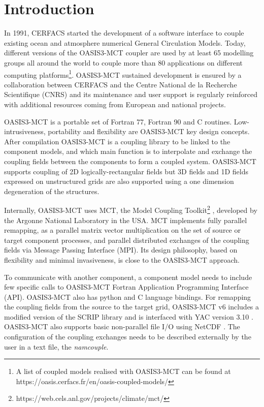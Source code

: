 \newpage
\chapter{Introduction}
\label{sec_step}

In 1991, CERFACS started the development of
a software interface to couple existing ocean and atmosphere numerical General
Circulation Models. Today, different versions of the 
OASIS3-MCT coupler are used by at least 65 modelling groups all around the
world to couple more than 80 applications on different computing platforms\footnote{A list of
coupled models realised with OASIS3-MCT can be found at https://oasis.cerfacs.fr/en/oasis-coupled-models/}.
OASIS3-MCT sustained development is ensured by a collaboration
between CERFACS and the Centre National de la Recherche Scientifique
(CNRS) and its maintenance and user support is regularly reinforced
with additional resources coming from European and national projects.

OASIS3-MCT is a portable set of Fortran 77, Fortran 90 and C
routines. Low-intrusiveness, portability and flexibility are
OASIS3-MCT key design concepts. After compilation OASIS3-MCT is a
coupling library to be linked to the component models, and which main
function is to interpolate and exchange the coupling fields between the components to form a coupled system.  OASIS3-MCT supports  coupling of 2D
logically-rectangular fields but 3D fields and 1D fields expressed on
unstructured grids are also supported using a one dimension
degeneration of the structures.

Internally, OASIS3-MCT uses MCT, the Model
Coupling Toolkit\footnote{https://web.cels.anl.gov/projects/climate/mct/} \citep{mct_larson} \citep{mct_jacob}, 
developed by the Argonne National Laboratory in the USA. MCT implements fully parallel remapping, as a parallel matrix vector 
multiplication on the set of source or
target component processes, and parallel distributed exchanges of the coupling
fields via Message Passing Interface
(MPI). 
Its design philosophy, based on flexibility and minimal invasiveness,
is close to the OASIS3-MCT approach. 

To communicate with another component, a component model needs to include few specific calls to OASIS3-MCT Fortran Application Programming Interface (API).  OASIS3-MCT also has python and C language bindings. For remapping the coupling fields from the source to the target grid, OASIS3-MCT v6 includes a modified version of the SCRIP library \citep{Jones99} and is interfaced with YAC version 3.10 \citep{hanke2016} \citep{hanke2019} \cite{jonville2024}. OASIS3-MCT also supports basic non-parallel file I/O using NetCDF .  The configuration of the coupling exchanges needs to be described externally by the user in a text file, the {\it namcouple}. 

